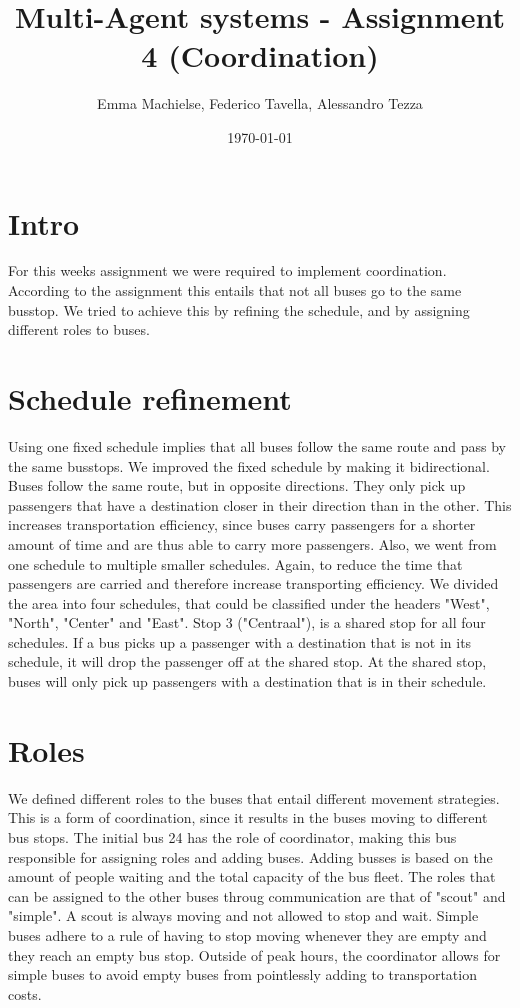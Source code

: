 \documentclass[a4paper]{article}
\title{Multi-Agent systems - Assignment 4 (Coordination)}
\author{Emma Machielse, Federico Tavella, Alessandro Tezza}
\date{\today}
\begin{document}
\Coordination

\section{Intro}
For this weeks assignment we were required to implement coordination. According to the assignment this entails that not all buses go to the same busstop. We tried to achieve this by refining the schedule, and by assigning different roles to buses. 

\section{Schedule refinement}
Using one fixed schedule implies that all buses follow the same route and pass by the same busstops. We improved the fixed schedule by making it bidirectional. Buses follow the same route, but in opposite directions. They only pick up passengers that have a destination closer in their direction than in the other. This increases transportation efficiency, since buses carry passengers for a shorter amount of time and are thus able to carry more passengers. 
\newline
Also, we went from one schedule to multiple smaller schedules. Again, to reduce the time that passengers are carried and therefore increase transporting efficiency. We divided the area into four schedules, that could be classified under the headers "West", "North", "Center" and "East". Stop 3 ("Centraal"), is a shared stop for all four schedules. If a bus picks up a passenger with a destination that is not in its schedule, it will drop the passenger off at the shared stop. At the shared stop, buses will only pick up passengers with a destination that is in their schedule. 

\section{Roles}
We defined different roles to the buses that entail different movement strategies. This is a form of coordination, since it results in the buses moving to different bus stops. The initial bus 24 has the role of coordinator, making this bus responsible for assigning roles and adding buses. Adding busses is based on the amount of people waiting and the total capacity of the bus fleet. The roles that can be assigned to the other buses throug communication are that of "scout" and "simple". A scout is always moving and not allowed to stop and wait. Simple buses adhere to a rule of having to stop moving whenever they are empty and they reach an empty bus stop. Outside of peak hours, the coordinator allows for simple buses to avoid empty buses from pointlessly adding to transportation costs.  
\end{document}

